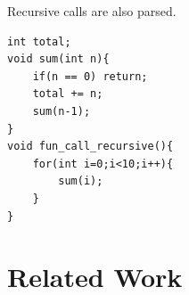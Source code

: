 Recursive calls are also parsed.

\begin{lstlisting}[label=code:filtering_generated,caption={Recursive Function Calls}]
int total;
void sum(int n){
    if(n == 0) return;
    total += n;
    sum(n-1);
}
void fun_call_recursive(){
    for(int i=0;i<10;i++){
        sum(i);
    }
}
\end{lstlisting}

\section{Related Work}





